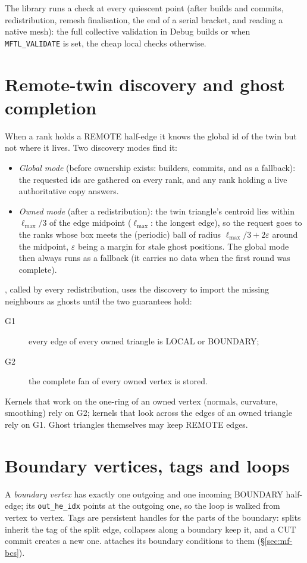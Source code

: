 The library runs a check at every quiescent point (after builds and commits, redistribution,
remesh finalisation, the end of a serial bracket, and reading a native mesh): the full
collective validation in Debug builds or when \texttt{MFTL\_VALIDATE} is set, the cheap local
checks otherwise.

\section{Remote-twin discovery and ghost completion}
\label{sec:completion}

When a rank holds a REMOTE half-edge it knows the global id of the twin but not where it lives.
Two discovery modes find it:
\begin{itemize}
  \item \emph{Global mode} (before ownership exists: builders, commits, and as a fallback): the
    requested ids are gathered on every rank, and any rank holding a live authoritative copy
    answers.
  \item \emph{Owned mode} (after a redistribution): the twin triangle's centroid lies within
    $\ell_{\max}/3$ of the edge midpoint ($\ell_{\max}$: the longest edge), so the request goes to
    the ranks whose box meets the (periodic) ball of radius $\ell_{\max}/3+2\varepsilon$ around
    the midpoint, $\varepsilon$ being a margin for stale ghost positions. The global mode then
    always runs as a fallback (it carries no data when the first round was complete).
\end{itemize}
, called by every redistribution, uses the discovery to import the missing
neighbours as ghosts until the two guarantees hold:
\begin{description}
  \item[G1] every edge of every owned triangle is LOCAL or BOUNDARY;
  \item[G2] the complete fan of every owned vertex is stored.
\end{description}
Kernels that work on the one-ring of an owned vertex (normals, curvature, smoothing) rely on G2;
kernels that look across the edges of an owned triangle rely on G1. Ghost triangles themselves
may keep REMOTE edges.

\section{Boundary vertices, tags and loops}
\label{sec:loops}

A \emph{boundary vertex} has exactly one outgoing and one incoming BOUNDARY half-edge; its
\texttt{out\_he\_idx} points at the outgoing one, so the loop is walked from vertex to vertex.
Tags are persistent handles for the parts of the boundary: splits inherit the tag of the split
edge, collapses along a boundary keep it, and a CUT commit creates a new one. \multi{} attaches
its boundary conditions to them (\S\ref{sec:mf-bcs}).

